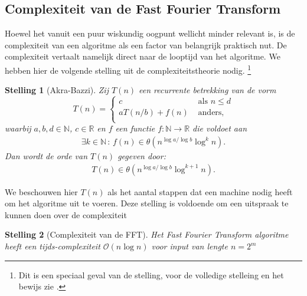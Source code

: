 \documentclass[11pt]{report}
\newcommand{\R}{\mathbb{R}}
\newcommand{\N}{\mathbb{N}}
\renewcommand{\O}{\mathcal{O}}
\theoremstyle{plain}
\newtheorem*{stelling}{Stelling}
\theoremstyle{remark}
\newcommand{\eq}[1]{\begin{eqnarray*} #1 \end{eqnarray*}}
\begin{document}
\subsection{Complexiteit van de Fast Fourier Transform}
Hoewel het vanuit een puur wiskundig oogpunt wellicht minder relevant is, is de complexiteit van een algoritme 
als een factor van belangrijk praktisch nut. De complexiteit vertaalt namelijk direct naar 
de looptijd van het algoritme. We hebben hier de volgende stelling uit de complexiteitstheorie nodig. 
\footnote{Dit is een speciaal geval van de stelling, voor de volledige stelleing en het bewijs zie \cite{akra-bazzi}.}

\begin{stelling}[Akra-Bazzi]
    Zij $T(n)$ een recurrente betrekking van de vorm
    \[
    T(n) = \begin{cases}
      c &\text{ als } n \leq d \\
      a T(n/b) + f(n) &\text{ anders}, \\
    \end{cases}
    \]
    waarbij $a,b,d\in\N$, $c\in\R$ en $f$ een functie $f:\N\rightarrow\R$ die voldoet aan 
    \eq{
  \exists k \in \N \,:\, f(n) \in \theta(n^{\log a/\log b} \log^k n).
    }
    Dan wordt de orde van $T(n)$ gegeven door:
    \eq{
      T(n) \in \theta(n^{\log a / \log b} \log^{k+1}n).
    }
\end{stelling}
We beschouwen hier $T(n)$ als het aantal stappen dat een machine nodig heeft om het algoritme uit te voeren.
Deze stelling is voldoende om een uitspraak te kunnen doen over de complexiteit 
\begin{stelling}[Complexiteit van de FFT]
  Het Fast Fourier Transform algoritme heeft een tijds-complexiteit $\O(n\log n)$ voor input van lengte $n=2^m$ 
\end{stelling} 
\end{document}
